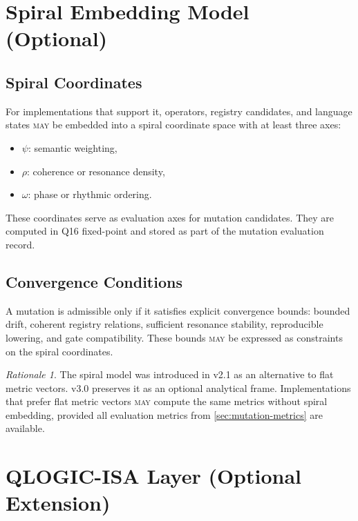 \documentclass[11pt,a4paper,twoside]{article}
\theoremstyle{definition}
\theoremstyle{remark}
\newtheorem{rationale}{Rationale}[section]
\newcommand{\may}{\textsc{may}}
\begin{document}

\section{Spiral Embedding Model (Optional)}
\label{sec:spiral}

\subsection{Spiral Coordinates}

For implementations that support it, operators, registry candidates, and language states \may{} be embedded into a spiral coordinate space with at least three axes:
\begin{itemize}[nosep]
  \item $\psi$: semantic weighting,
  \item $\rho$: coherence or resonance density,
  \item $\omega$: phase or rhythmic ordering.
\end{itemize}

These coordinates serve as evaluation axes for mutation candidates. They are computed in Q16 fixed-point and stored as part of the mutation evaluation record.

\subsection{Convergence Conditions}

A mutation is admissible only if it satisfies explicit convergence bounds: bounded drift, coherent registry relations, sufficient resonance stability, reproducible lowering, and gate compatibility. These bounds \may{} be expressed as constraints on the spiral coordinates.

\begin{rationale}
The spiral model was introduced in v2.1 as an alternative to flat metric vectors. v3.0 preserves it as an optional analytical frame. Implementations that prefer flat metric vectors \may{} compute the same metrics without spiral embedding, provided all evaluation metrics from \cref{sec:mutation-metrics} are available.
\end{rationale}



\section{QLOGIC-ISA Layer (Optional Extension)}
\label{sec:qlogic-isa}
\end{document}
